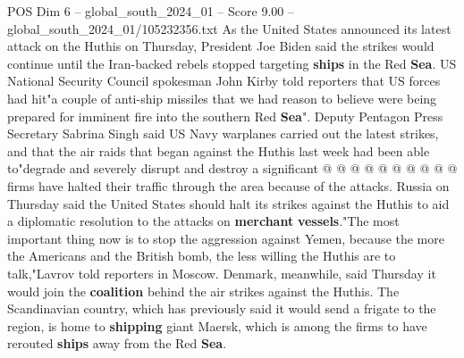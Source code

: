 \begin{textsample}{POS Dim 6 – global\_south\_2024\_01 – Score 9.00 – global\_south\_2024\_01/105232356.txt}
As the United States announced its latest attack on the Huthis on Thursday, President Joe Biden said the strikes would continue until the Iran-backed rebels stopped targeting \textbf{ships} in the Red \textbf{Sea}.
US National Security Council spokesman John Kirby told reporters that US forces had hit"a couple of anti-ship missiles that we had reason to believe were being prepared for imminent fire into the southern Red \textbf{Sea}".
Deputy Pentagon Press Secretary Sabrina Singh said US Navy warplanes carried out the latest strikes, and that the air raids that began against the Huthis last week had been able to"degrade and severely disrupt and destroy a significant @ @ @ @ @ @ @ @ @ @ firms have halted their traffic through the area because of the attacks.
Russia on Thursday said the United States should halt its strikes against the Huthis to aid a diplomatic resolution to the attacks on \textbf{merchant} \textbf{vessels}."The most important thing now is to stop the aggression against Yemen, because the more the Americans and the British bomb, the less willing the Huthis are to talk,"Lavrov told reporters in Moscow.
Denmark, meanwhile, said Thursday it would join the \textbf{coalition} behind the air strikes against the Huthis.
The Scandinavian country, which has previously said it would send a frigate to the region, is home to \textbf{shipping} giant Maersk, which is among the firms to have rerouted \textbf{ships} away from the Red \textbf{Sea}.

\end{textsample}

